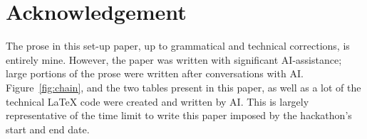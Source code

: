 \section{Acknowledgement}

The prose in this set-up paper, up to grammatical and technical corrections, is entirely mine.
However, the paper was written with significant AI-assistance; large portions of the prose were written after conversations with AI.
Figure~\ref{fig:chain}, and the two tables present in this paper, as well as a lot of the technical \LaTeX{} code were created and written by AI.
This is largely representative of the time limit to write this paper imposed by the hackathon's start and end date.